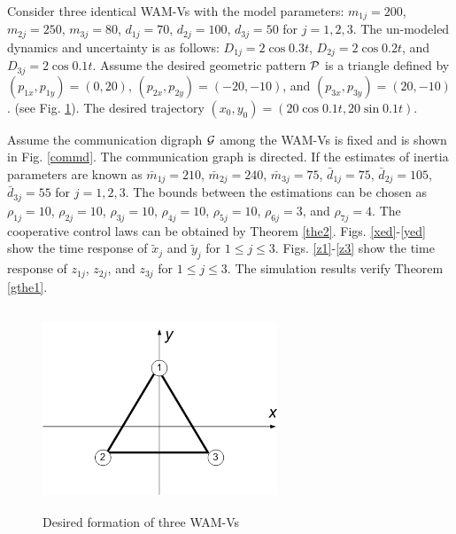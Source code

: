 \documentclass[letterpaper, 10 pt, conference]{ieeeconf}  %
\begin{document}
Consider three identical WAM-Vs with the model parameters: $m_{1j}=200$, $m_{2j}=250$,
$m_{3j}=80$, $d_{1j}=70$, $d_{2j}=100$, $d_{3j}=50$
for $j=1,2,3$. The un-modeled dynamics and uncertainty is as follows: $D_{1j}=2\cos 0.3t$, $D_{2j}=2\cos 0.2t$, and $D_{3j}=2\cos 0.1t$.
Assume the desired geometric pattern $\cal P$ is a triangle defined
by $(p_{1x},p_{1y})=(0,20)$, $(p_{2x},p_{2y})=(-20,-10)$,
and $(p_{3x},p_{3y})=(20,-10)$. (see Fig. \ref{pattern}). The desired trajectory $(x_0,y_0)=(20\cos0.1t, 20\sin0.1t)$.
%
%


Assume the communication digraph ${\cal G}$ among the WAM-Vs is
fixed and is shown  in Fig. \ref{commd}. The communication graph is
directed. If the estimates of inertia parameters are known as
$\bar{m}_{1j}=210$, $\bar{m}_{2j}=240$, $\bar{m}_{3j}=75$,
$\bar{d}_{1j}=75$, $\bar{d}_{2j}=105$, $\bar{d}_{3j}=55$
for $j=1,2,3$. The bounds between the estimations can be chosen as
$\rho_{1j}=10$, $\rho_{2j}=10$, $\rho_{3j}=10$, $\rho_{4j}=10$,
$\rho_{5j}=10$, $\rho_{6j}=3$, and $\rho_{7j}=4$. The cooperative
control laws can be obtained by Theorem \ref{the2}. Figs. \ref{xed}-\ref{yed} show the
time response of $\tilde{x}_j$ and $\tilde{y}_j$  for $1\leq
j\leq 3$.  Figs. \ref{z1}-\ref{z3} show the
time response of $z_{1j}$, $z_{2j}$, and $z_{3j}$ for $1\leq j\leq 3$. 
The simulation results verify Theorem \ref{gthe1}.
%


\begin{figure}
\begin{center}
\includegraphics[width=7cm,height=6cm]{pattern}
\caption{Desired formation of three WAM-Vs\label{pattern}}
\end{center}
\end{figure}
\end{document}
